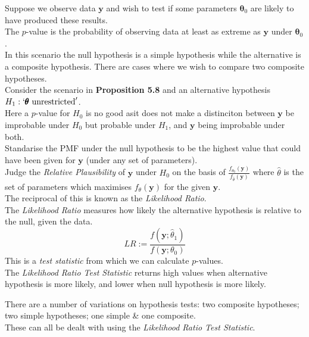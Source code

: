 \documentclass[11pt,a4paper]{article}
\begin{document}
Suppose we observe data $\textbf{y}$ and wish to test if some parameters $\pmb\theta_0$ are likely to have produced these results.\\
The $p$-value is the probability of observing data at least as extreme as $\textbf{y}$ under $\pmb\theta_0$.\\
\nb In this scenario the null hypothesis is a simple hypothesis while the alternative is a composite hypothesis. There are cases where we wish to compare two composite hypotheses.\\

Consider the scenario in \textbf{Proposition 5.8} and an alternative hypothesis $H_1:`\pmb\theta\text{ unrestricted}'$.\\
Here a $p$-value for $H_0$ is no good asit does not make a distinciton between $\textbf{y}$ be improbable under $H_0$ but probable under $H_1$, and $\textbf{y}$ being improbable under both.\\

Standarise the PMF under the null hypothesis to be the highest value that could have been given for $\textbf{y}$ (under any set of parameters).\\
\ie Judge the \textit{Relative Plausibility} of $\textbf{y}$ under $H_0$ on the basis of $\frac{f_{\theta_0}(\textbf{y})}{f_{\hat\theta}(\textbf{y})}$ where $\hat\theta$ is the set of parameters which maximises $f_\theta(\textbf{y})$ for the given $\textbf{y}$.\\
\nb The reciprocal of this is known as the \textit{Likelihood Ratio}.\\

The \textit{Likelihood Ratio} measures how likely the alternative hypothesis is relative to the null, given the data.
$$LR:=\frac{f(\textbf{y};\hat\theta_1)}{f(\textbf{y};\theta_0)}$$
This is a \textit{test statistic} from which we can calculate $p$-values.\\
\nb The \textit{Likelihood Ratio Test Statistic} returns high values when alternative hypothesis is more likely, and lower when null hypothesis is more likely.

There are a number of variations on hypothesis tests: two composite hypotheses; two simple hypotheses; one simple \& one composite.\\
These can all be dealt with using the \textit{Likelihood Ratio Test Statistic}.\\
\end{document}
